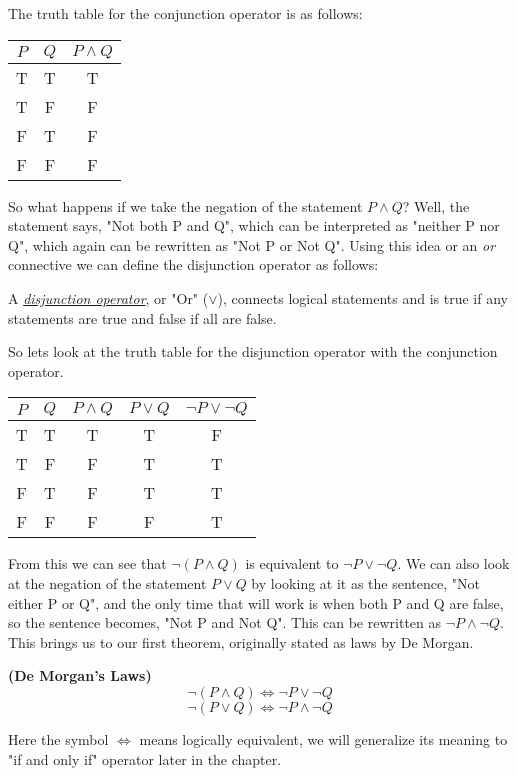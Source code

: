 The truth table for the conjunction operator is as follows:
\begin{center}
	\begin{tabular}{cc|c}
		$P$ & $Q$ & $P \land Q$ \\
		\hline
		T & T & T \\
		T & F & F \\
		F & T & F \\
		F & F & F \\
	\end{tabular}
\end{center}

So what happens if we take the negation of the statement $P \land Q$?
Well, the statement says, "Not both P and Q", which can be interpreted as "neither P nor Q", which again can be rewritten as "Not P or Not Q".
Using this idea or an \emph{or} connective we can define the disjunction operator as follows:

\begin{defn}
	A \underline{\emph{disjunction operator}}, or "Or" ($\lor$), connects logical statements and is true if any statements are true and false if all are false.
\end{defn}

So lets look at the truth table for the disjunction operator with the conjunction operator.

\begin{center}
	\begin{tabular}{cc|ccc}
		$P$ & $Q$ & $P \land Q$ & $P \lor Q$ & $\neg P \lor \neg Q$ \\
		\hline
		T & T & T & T & F \\
		T & F & F & T & T \\
		F & T & F & T & T \\
		F & F & F & F & T \\
	\end{tabular}
\end{center}

From this we can see that $\neg (P \land Q)$ is equivalent to $\neg P \lor \neg Q$.
We can also look at the negation of the statement $P \lor Q$ by looking at it as the sentence, "Not either P or Q", and the only time that will work is when both P and Q are false, so the sentence becomes, "Not P and Not Q".
This can be rewritten as $\neg P \land \neg Q$.
This brings us to our first theorem, originally stated as laws by De Morgan.

\begin{thm}
	\textbf{(De Morgan's Laws)} \\
	\label{Thm:DeMorganLogic}
	\begin{equation}
		\nonumber
		\neg ( P \land Q ) \iff \neg P \lor \neg Q
	\end{equation}
	\begin{equation}
		\nonumber
		\neg ( P \lor Q ) \iff \neg P \land \neg Q
	\end{equation}
\end{thm}
Here the symbol $\iff$ means logically equivalent, we will generalize its meaning to "if and only if" operator later in the chapter.

